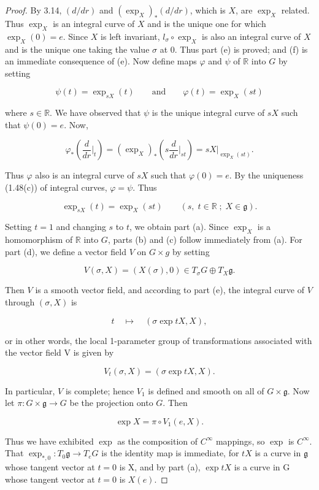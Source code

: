 \begin{proof}
By 3.14, $(d/dr)$ and $(\exp_{X})_{*}(d/dr)$, which is $X$, are $\exp_X$ related. Thus $\exp_X$ is an integral curve of $X$ and is the unique one for which $\exp_X(0) = e$. Since $X$ is left invariant, $l_\sigma\circ\exp_X$ is also an integral curve of $X$ and is the unique one taking the value $\sigma$ at 0. Thus part (e) is proved; and (f) is an immediate consequence of (e). Now define maps $\varphi$ and $\psi$ of $\mathbb{R}$ into $G$ by setting

\begin{equation}
\tag{1}\label{eq:3.31:1}
\psi(t)=\exp_{sX}(t)\qquad\mathrm{and}\qquad\varphi(t)=\exp_{X}(st)
\end{equation}

where $s \in \mathbb{R}$. We have observed that $\psi$ is the unique integral curve of $sX$ such that $\psi(0) = e$. Now,

\[
\varphi_{*}\left(\frac{d}{d r}\bigg\vert_{t}\right)=(\exp_{X})_{*}\left(s\frac{d}{d r}\bigg\vert_{s t}\right)=s X\big\vert_{\exp_{X}(s t)}.
\]

Thus $\varphi$ also is an integral curve of $sX$ such that $\varphi(0)=e$. By the uniqueness (1.48(c)) of integral curves, $\varphi=\psi$. Thus

\begin{equation}
\tag{2}\label{eq:3.31:2}
\exp_{s X}(t)=\exp_{X}(s t)\qquad(s,\;t\in\mathbb{R}\;;\;X\in\mathfrak{g}).
\end{equation}

Setting $t=1$ and changing $s$ to $t$, we obtain part (a). Since $\exp_X$ is a homomorphism of $\mathbb{R}$ into $G$, parts (b) and (c) follow immediately from (a). For part (d), we define a vector field $V$ on $G\times g$ by setting

\[
V(\sigma,X)=(X(\sigma),0)\in T_{\sigma} G\oplus T_X\mathfrak{g}.
\]

Then $V$ is a smooth vector field, and according to part (e), the integral curve of $V$ through $(\sigma,X)$ is

\[
t\quad\mapsto\quad(\sigma\exp tX,X),
\]

or in other words, the local 1-parameter group of transformations associated with the vector field V is given by

\[
V_{t}(\sigma,X)=(\sigma\exp tX,X).
\]

In particular, $V$ is complete; hence $V_{1}$ is defined and smooth on all of $G\times\mathfrak{g}$. Now let $\pi\colon G\times\mathfrak{g}\to G$ be the projection onto $G$. Then

\[
\exp X=\pi\circ V_{1}(e,X).
\]

Thus we have exhibited $\exp$ as the composition of  $ C^{\infty} $ mappings, so  $ \exp $ is  $ C^{\infty} $. That  $ \exp_{*,0}\colon T_0\mathfrak{g}\to T_{e} G $ is the identity map is immediate, for  $ tX $ is a curve in $\mathfrak{g}$ whose tangent vector at  $ t = 0 $ is X, and by part (a),  $ \exp tX $ is a curve in G whose tangent vector at  $ t = 0 $ is  $ X(e) $.

\end{proof}

